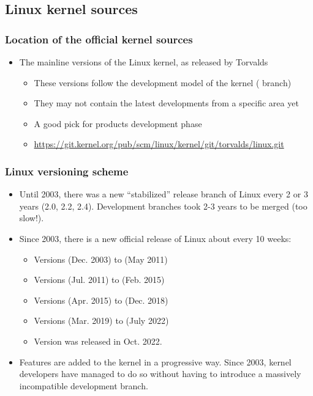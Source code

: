 \subsection{Linux kernel sources}

\begin{frame}
  \frametitle{Location of the official kernel sources}
  \begin{itemize}
  \item The mainline versions of the Linux kernel, as released by Torvalds
    \begin{itemize}
    \item These versions follow the development model of the kernel
          ( branch)
    \item They may not contain the latest developments from a specific
      area yet
    \item A good pick for products development phase
    \item \url{https://git.kernel.org/pub/scm/linux/kernel/git/torvalds/linux.git}
    \end{itemize}
  \end{itemize}
\end{frame}

\begin{frame}
  \frametitle{Linux versioning scheme}
  \begin{itemize}
  \item Until 2003, there was a new ``stabilized'' release branch of Linux every
        2 or 3 years (2.0, 2.2, 2.4). Development branches took 2-3
        years to be merged (too slow!).
  \item Since 2003, there is a new official release of Linux about every
	10 weeks:
  \begin{itemize}
	\item Versions  (Dec. 2003) to  (May 2011)
	\item Versions  (Jul. 2011) to  (Feb. 2015)
	\item Versions  (Apr. 2015) to  (Dec. 2018)
	\item Versions  (Mar. 2019) to  (July 2022)
	\item Version  was released in Oct. 2022.
  \end{itemize}
  \item Features are added to the kernel in a progressive way. Since
        2003, kernel developers have managed to do so without having
        to introduce a massively incompatible development branch.
  \end{itemize}
\end{frame}

